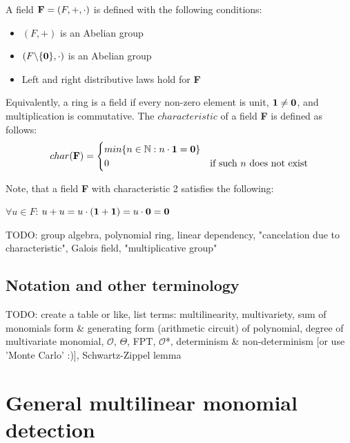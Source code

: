 A field $\textbf F = (F, +, \cdot)$ is defined with the following conditions:
\begin{itemize}
  \item $(F, +)$ is an Abelian group
  \item $(F\backslash \{\textbf 0\}, \cdot )$ is an Abelian group
  \item Left and right distributive laws hold for \textbf F
\end{itemize}

Equivalently, a ring is a field if every non-zero element is unit, $\textbf 1 \neq \textbf 0$, and multiplication is commutative. 
The $characteristic$ of a field \textbf F is defined as follows:
\begin{equation}
  char(\textbf F) =
    \begin{cases}
      min\{n \in \mathbb N : n \cdot \textbf 1 = \textbf 0 \}\\
      0 & \text{if such $n$ does not exist}\\
    \end{cases}       
\end{equation}


Note, that a field \textbf F with 
characteristic 2 satisfies the following:
\begin{center}
  $\forall u \in F$: $u + u = u \cdot (\textbf 1 + \textbf 1) = u \cdot \textbf 0 = \textbf 0$
\end{center}

TODO: group algebra, polynomial ring, linear dependency, "cancelation due to characteristic", 
Galois field, "multiplicative group"\nl

\subsection{Notation and other terminology} 
\label{sect:prelims_other}

TODO: create a table or like, list terms: 
multilinearity, multivariety, sum of monomials form \& generating form (arithmetic circuit) of polynomial, 
degree of multivariate monomial, $\mathcal{O}$, $\Theta$, FPT, $\mathcal{O}$*, determinism \& non-determinism [or use 'Monte Carlo' :)], 
Schwartz-Zippel lemma

\clearpage
\section{General multilinear monomial detection}

